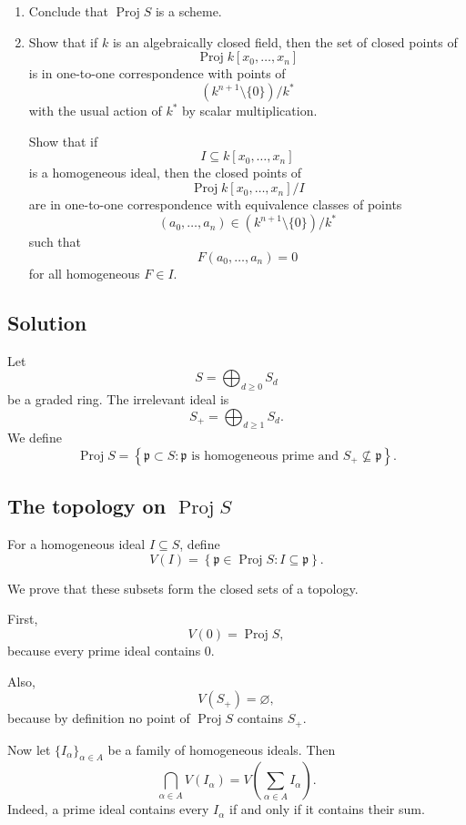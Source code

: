 \documentclass[12pt,a4paper]{article}
\DeclareMathOperator{\Proj}{Proj}
\theoremstyle{notespace}
\begin{document}
\begin{enumerate}
\begin{enumerate}
		\item[(c)]
		Conclude that \(\Proj S\) is a scheme.
		
		\item[(d)]
		Show that if \(k\) is an algebraically closed field, then the set of closed points
		of
		\[
		\Proj k[x_0,\dots,x_n]
		\]
		is in one-to-one correspondence with points of
		\[
		(k^{n+1}\setminus\{0\})/k^*
		\]
		with the usual action of \(k^*\) by scalar multiplication.
		
		Show that if
		\[
		I\subseteq k[x_0,\dots,x_n]
		\]
		is a homogeneous ideal, then the closed points of
		\[
		\Proj k[x_0,\dots,x_n]/I
		\]
		are in one-to-one correspondence with equivalence classes of points
		\[
		(a_0,\dots,a_n)\in (k^{n+1}\setminus\{0\})/k^*
		\]
		such that
		\[
		F(a_0,\dots,a_n)=0
		\]
		for all homogeneous \(F\in I\).
	\end{enumerate}
\end{enumerate}

\subsection*{Solution}

Let
\[
S=\bigoplus_{d\ge 0}S_d
\]
be a graded ring. The irrelevant ideal is
\[
S_+ = \bigoplus_{d\ge 1}S_d.
\]
We define
\[
\Proj S
=
\left\{
\mathfrak p\subset S :
\mathfrak p \text{ is homogeneous prime and } S_+\not\subseteq \mathfrak p
\right\}.
\]

\subsection{The topology on \texorpdfstring{$\Proj S$}{Proj S}}

For a homogeneous ideal \(I\subseteq S\), define
\[
V(I)
=
\left\{
\mathfrak p\in \Proj S : I\subseteq \mathfrak p
\right\}.
\]

We prove that these subsets form the closed sets of a topology.

First,
\[
V(0)=\Proj S,
\]
because every prime ideal contains \(0\).

Also,
\[
V(S_+)=\varnothing,
\]
because by definition no point of \(\Proj S\) contains \(S_+\).

Now let \(\{I_\alpha\}_{\alpha\in A}\) be a family of homogeneous ideals. Then
\[
\bigcap_{\alpha\in A}V(I_\alpha)
=
V\left(\sum_{\alpha\in A}I_\alpha\right).
\]
Indeed, a prime ideal contains every \(I_\alpha\) if and only if it contains their sum.
\end{document}
